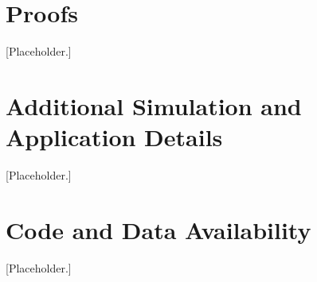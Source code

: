\documentclass[12pt]{article}
\begin{document}
\begin{appendices}

\section{Proofs}
\label{app:proofs}
[Placeholder.]

\section{Additional Simulation and Application Details}
\label{app:extra}
[Placeholder.]

\section{Code and Data Availability}
\label{app:code}
[Placeholder.]

\end{appendices}
\end{document}
